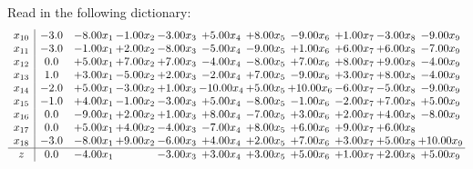 \documentclass[9pt]{article}
\begin{document}
Read in the following dictionary:
\[\begin{array}{c| c c@{\hskip 2pt} c@{\hskip 2pt} c@{\hskip 2pt} c@{\hskip 2pt} c@{\hskip 2pt} c@{\hskip 2pt} c@{\hskip 2pt} c@{\hskip 2pt} c@{\hskip 2pt} }
 x_{10}   &  -3.0 & -8.00 x_{1} & -1.00 x_{2} & -3.00 x_{3} & +  5.00 x_{4} & +  8.00 x_{5} & -9.00 x_{6} & +  1.00 x_{7} & -3.00 x_{8} & -9.00 x_{9}\\
 x_{11}   &  -3.0 & -1.00 x_{1} & +  2.00 x_{2} & -8.00 x_{3} & -5.00 x_{4} & -9.00 x_{5} & +  1.00 x_{6} & +  6.00 x_{7} & +  6.00 x_{8} & -7.00 x_{9}\\
 x_{12}   &  0.0 & +  5.00 x_{1} & +  7.00 x_{2} & +  7.00 x_{3} & -4.00 x_{4} & -8.00 x_{5} & +  7.00 x_{6} & +  8.00 x_{7} & +  9.00 x_{8} & -4.00 x_{9}\\
 x_{13}   &  1.0 & +  3.00 x_{1} & -5.00 x_{2} & +  2.00 x_{3} & -2.00 x_{4} & +  7.00 x_{5} & -9.00 x_{6} & +  3.00 x_{7} & +  8.00 x_{8} & -4.00 x_{9}\\
 x_{14}   &  -2.0 & +  5.00 x_{1} & -3.00 x_{2} & +  1.00 x_{3} & -10.00 x_{4} & +  5.00 x_{5} & + 10.00 x_{6} & -6.00 x_{7} & -5.00 x_{8} & -9.00 x_{9}\\
 x_{15}   &  -1.0 & +  4.00 x_{1} & -1.00 x_{2} & -3.00 x_{3} & +  5.00 x_{4} & -8.00 x_{5} & -1.00 x_{6} & -2.00 x_{7} & +  7.00 x_{8} & +  5.00 x_{9}\\
 x_{16}   &  0.0 & -9.00 x_{1} & +  2.00 x_{2} & +  1.00 x_{3} & +  8.00 x_{4} & -7.00 x_{5} & +  3.00 x_{6} & +  2.00 x_{7} & +  4.00 x_{8} & -8.00 x_{9}\\
 x_{17}   &  0.0 & +  5.00 x_{1} & +  4.00 x_{2} & -4.00 x_{3} & -7.00 x_{4} & +  8.00 x_{5} & +  6.00 x_{6} & +  9.00 x_{7} & +  6.00 x_{8} &   \\
 x_{18}   &  -3.0 & -8.00 x_{1} & +  9.00 x_{2} & -6.00 x_{3} & +  4.00 x_{4} & +  2.00 x_{5} & +  7.00 x_{6} & +  3.00 x_{7} & +  5.00 x_{8} & + 10.00 x_{9}\\
\hline
z    &  0.0 & -4.00 x_{1} &   & -3.00 x_{3} & +  3.00 x_{4} & +  3.00 x_{5} & +  5.00 x_{6} & +  1.00 x_{7} & +  2.00 x_{8} & +  5.00 x_{9}\\
\end{array}\]
\end{document}

